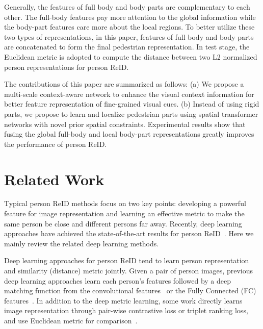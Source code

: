 \documentclass[10pt,twocolumn,letterpaper]{article}
\begin{document}
Generally, the features of full body and body parts are complementary to each other.
The full-body features pay more attention to the global information while the body-part features care more about the local regions.
To better utilize these two types of representations, in this paper, features of full body and body parts are concatenated to form the final pedestrian
representation.
In test stage, the Euclidean metric is adopted to compute the distance between two L2 normalized person representations for person ReID.

The contributions of this paper are summarized as follows:
(a) We propose a multi-scale context-aware network to enhance the visual context information for better feature representation of fine-grained visual cues.
(b) Instead of using rigid parts, we propose to learn and localize pedestrian parts using spatial transformer networks with novel prior spatial constraints.
Experimental results show that fusing the global full-body and local body-part representations greatly improves the performance of person ReID.

\vspace{-0.5em}
\section{Related Work}
\label{relatedwork}
Typical person ReID methods focus on two key points: developing a powerful feature for image representation and
learning an effective metric to make the same person be close and different persons far away.
Recently, deep learning approaches have achieved the state-of-the-art results for person ReID~\cite{XiaotongCVPR16Domain,ZhengliangECCV16,VariorECCV16Gated,zheng2016personreview,zhang2015bit}.
Here we mainly review the related deep learning methods.

Deep learning approaches for person ReID tend to learn person representation and similarity (distance) metric jointly.
Given a pair of person images, previous deep learning approaches learn each person's features followed by a deep matching function
from the convolutional features~\cite{LiWeiCVPR14,AhmedCVPR15improved,Chen2017aaai,Chen2017cvprid} or the Fully Connected (FC) features~\cite{YiICPR14DML,wang2016dari,Shihanlin2016Embedding}.
In addition to the deep metric learning, some work directly learns image representation through pair-wise contrastive loss or triplet ranking loss,
and use Euclidean metric for comparison~\cite{DingPR15deep,Chengde2016person,Varior2016Siamese,VariorECCV16Gated}.
\end{document}
